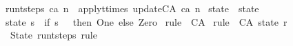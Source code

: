 \begin{isabellebody}
{\isachardoublequoteopen}run{\isacharunderscore}t{\isacharunderscore}steps\ ca\ n\ {\isacharequal}\ apply{\isacharunderscore}t{\isacharunderscore}times\ update{\isacharunderscore}CA\ ca\ n{\isachardoublequoteclose}%
\isadelimdocument
%
\endisadelimdocument
%
\isatagdocument
%
\isamarkuptrue%
%
\endisatagdocument
{\isafolddocument}%
%
\isadelimdocument
%
\endisadelimdocument
{}\isamarkupfalse%
\ state{}\ {\isacharcolon}{\isacharcolon}\ state\ \isanewline
{\isachardoublequoteopen}state{}\ s\ {\isasymequiv}\ {\isacharparenleft}if\ s\ {\isacharequal}\ {}\ then\ One\ else\ Zero{\isacharparenright}{\isachardoublequoteclose}\isanewline
\isanewline
{}\isamarkupfalse%
\ rule{}{}{}\ {\isacharcolon}{\isacharcolon}\ CA\ \isanewline
{\isachardoublequoteopen}rule{}{}{}\ {\isasymequiv}\ CA\ state{}\ r{}{}{}{\isachardoublequoteclose}\isanewline
\isanewline
{}\isamarkupfalse%
\ {\isachardoublequoteopen}State\ {\isacharparenleft}run{\isacharunderscore}t{\isacharunderscore}steps\ rule{}{}{}\ {}{\isacharparenright}\ {\isacharparenleft}{\isacharminus}{}{\isacharparenright}{\isachardoublequoteclose}\isanewline
%
\isadelimtheory
%
\endisadelimtheory
%
\isatagtheory
{}\isamarkupfalse%
%
\endisatagtheory
{\isafoldtheory}%
%
\isadelimtheory
%
\endisadelimtheory
%
\end{isabellebody}%
\endinput
